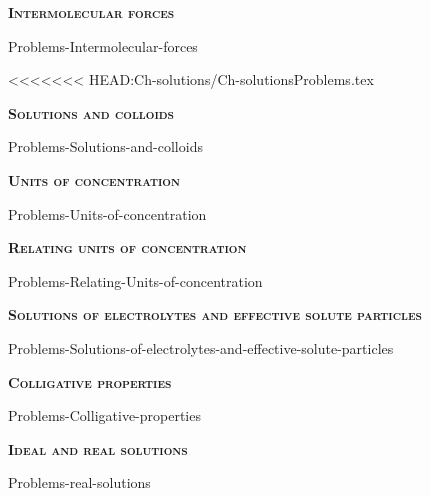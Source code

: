 \documentclass[main.tex]{subfiles}
\newcommand\chapterlabel{Ch-solids}
\begin{document}
\newpage
\setdoublesep{0.35700 em}  %
\setatomsep{1.78500 em}    %
\setbondoffset{0.18265 em} %
\renewcommand{\bondwidth}{0.06642 em} %
\setbondstyle{line width = \bondwidth}
\fancyhfoffset[E,O]{0pt}
\setlength{\columnsep}{30pt}
\begin{conclusion}
\iftoggle{chem121}{}{\setcounter{chapter}{10}}
\end{conclusion}
\begin{multicols*}{2}\setcounter{numA}{1}  %

{\raggedright\textsc{\textbf{Intermolecular forces }}\par}
{Problems-Intermolecular-forces}

<<<<<<< HEAD:Ch-solutions/Ch-solutionsProblems.tex

%



{\raggedright\textsc{\textbf{Solutions and colloids }}\par}
{Problems-Solutions-and-colloids}
{\raggedright\textsc{\textbf{Units of concentration }}\par}
{Problems-Units-of-concentration}
{\raggedright\textsc{\textbf{Relating units of concentration }}\par}
{Problems-Relating-Units-of-concentration}

{\raggedright\textsc{\textbf{Solutions of electrolytes and effective solute particles }}\par}
{Problems-Solutions-of-electrolytes-and-effective-solute-particles}
{\raggedright\textsc{\textbf{Colligative properties }}\par}
{Problems-Colligative-properties}
{\raggedright\textsc{\textbf{Ideal and real solutions }}\par}{Problems-real-solutions}


\end{multicols*}
\end{document}
